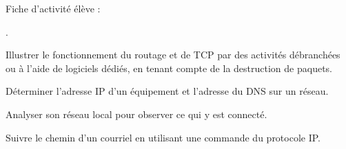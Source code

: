 \noindent Fiche d'activité élève :
\begin{jazzitemize}
\item {}.
\end{jazzitemize}


\begin{tcolorbox}[title={Ce que propose le programme}, toprule=0pt, leftrule=0pt, rightrule=0pt, arc=0pt,
                  fonttitle=\scshape\boxtitlefont,
                  colbacktitle=white, coltitle=firstcolor, colframe=firstcolor, colback=firstcolor!10,
                  breakable, enhanced jigsaw]
\begin{jazzitemize}
\item Illustrer le fonctionnement du routage et de TCP par des activités  débranchées ou à l’aide de logiciels dédiés, en tenant compte de la destruction de paquets.   
\item Déterminer l’adresse IP d’un équipement et l’adresse du DNS sur un réseau. 
\item Analyser son réseau local pour observer ce qui y est connecté. 
\item Suivre le chemin d’un courriel en utilisant une commande du protocole IP. 
\end{jazzitemize}
\end{tcolorbox}

